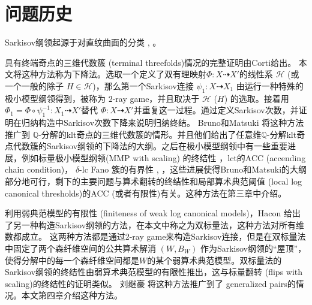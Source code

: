 \section{问题历史}

Sarkisov纲领起源于对直纹曲面的分类 \cite{sarkisovBIRATIONALAUTOMORPHISMSCONIC1981}, \cite{sarkisovCONICBUNDLESTRUCTURES1983}。

具有终端奇点的三维代数簇 (terminal threefolds)情况的完整证明由Corti\cite{cortiFactoringBirationalMaps}给出。 本文将这种方法称为下降法。选取一个定义了双有理映射$\Phi:X \dashrightarrow X'$的线性系 $\mathcal{H}$ (或一个一般的除子 $H \in \mathcal{H}$)，那么第一个Sarkisov连接 $\psi_1:X\dashrightarrow X_1$ 由运行一种特殊的极小模型纲领得到，被称为 $2$-ray game，并且取决于 $\mathcal{H}$ ($H$) 的选取。接着用 $\Phi_{1}=\Phi\circ \psi_1^{-1}: X_1 \dashrightarrow X'$替代 $\Phi:X\dashrightarrow X'$并重复这一过程。通过定义Sarkisov次数，并证明在归纳构造中Sarkisov次数下降来说明归纳终结。 Bruno和Matsuki \cite{brunoLogSarkisovProgram1995} 将这种方法推广到 $\mathbb{Q}$-分解的klt奇点的三维代数簇的情形。并且他们给出了任意维$\mathbb{Q}$-分解klt奇点代数簇的Sarkisov纲领的下降法的大纲。之后在极小模型纲领中有一些重要进展，例如标量极小模型纲领(MMP with scaling) 的终结性 \cite{BCHM10}，lct的ACC (accending chain condition)\cite{HMX14}， $\delta$-lc Fano 簇的有界性 \cite{Bir19}, \cite{birkarSingularitiesLinearSystems2020}，这些进展使得Bruno和Matsuki的大纲部分地可行，剩下的主要问题与算术翻转的终结性和局部算术典范阈值 (local log canonical thresholds)的ACC (或者有限性)有关。这种方法在第三章中介绍。



利用弱典范模型的有限性\cite{BCHM10} (finiteness of weak log canonical models)，Hacon \cite{haconMinimalModelProgram2012} 给出了另一种构造Sarkisov纲领的方法，在本文中称之为双标量法，这种方法对所有维数都成立。
这两种方法都是通过2-ray game来构造Sarkisov连接，但是在双标量法中固定了两个森纤维空间的公共算术解消 $(W,B_W)$ 作为Sarkisov纲领的``屋顶''，使得分解中的每一个森纤维空间都是$W$的某个弱算术典范模型。双标量法的Sarkisov纲领的终结性由弱算术典范模型的有限性推出，这与标量翻转 (flips with scaling)的终结性的证明类似。
刘继豪 \cite{liuSarkisovProgramGeneralized2021} 将这种方法推广到了 generalized pairs的情况。本文第四章介绍这种方法。


